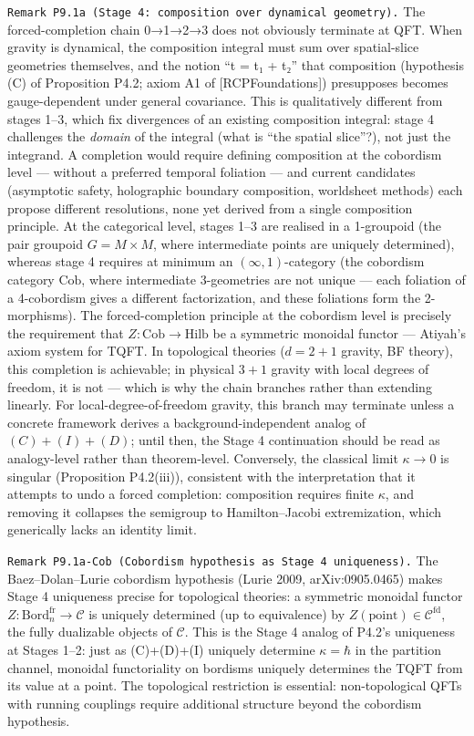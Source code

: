 \documentclass[
]{article}
\begin{document}
\texttt{Remark\ P9.1a\ (Stage\ 4:\ composition\ over\ dynamical\ geometry).}
The forced-completion chain 0→1→2→3 does not obviously terminate at QFT.
When gravity is dynamical, the composition integral must sum over
spatial-slice geometries themselves, and the notion ``t = t₁ + t₂'' that
composition (hypothesis (C) of Proposition P4.2; axiom A1 of
{[}RCPFoundations{]}) presupposes becomes gauge-dependent under general
covariance. This is qualitatively different from stages 1--3, which fix
divergences of an existing composition integral: stage 4 challenges the
\emph{domain} of the integral (what is ``the spatial slice''?), not just
the integrand. A completion would require defining composition at the
cobordism level --- without a preferred temporal foliation --- and
current candidates (asymptotic safety, holographic boundary composition,
worldsheet methods) each propose different resolutions, none yet derived
from a single composition principle. At the categorical level, stages
1--3 are realised in a 1-groupoid (the pair groupoid \(G = M \times M\),
where intermediate points are uniquely determined), whereas stage 4
requires at minimum an \((\infty,1)\)-category (the cobordism category
\(\mathrm{Cob}\), where intermediate 3-geometries are not unique ---
each foliation of a 4-cobordism gives a different factorization, and
these foliations form the 2-morphisms). The forced-completion principle
at the cobordism level is precisely the requirement that
\(Z\colon \mathrm{Cob} \to \mathrm{Hilb}\) be a symmetric monoidal
functor --- Atiyah's axiom system for TQFT. In topological theories
(\(d=2{+}1\) gravity, BF theory), this completion is achievable; in
physical \(3{+}1\) gravity with local degrees of freedom, it is not ---
which is why the chain branches rather than extending linearly. For
local-degree-of-freedom gravity, this branch may terminate unless a
concrete framework derives a background-independent analog of
\((C)+(I)+(D)\); until then, the Stage 4 continuation should be read as
analogy-level rather than theorem-level. Conversely, the classical limit
\(\kappa\to 0\) is singular (Proposition P4.2(iii)), consistent with the
interpretation that it attempts to undo a forced completion: composition
requires finite \(\kappa\), and removing it collapses the semigroup to
Hamilton--Jacobi extremization, which generically lacks an identity
limit.

\texttt{Remark\ P9.1a-Cob\ (Cobordism\ hypothesis\ as\ Stage\ 4\ uniqueness).}
The Baez--Dolan--Lurie cobordism hypothesis (Lurie 2009,
arXiv:0905.0465) makes Stage 4 uniqueness precise for topological
theories: a symmetric monoidal functor
\(Z\colon \mathrm{Bord}_n^{\mathrm{fr}} \to \mathcal{C}\) is uniquely
determined (up to equivalence) by
\(Z(\mathrm{point}) \in \mathcal{C}^{\mathrm{fd}}\), the fully
dualizable objects of \(\mathcal{C}\). This is the Stage 4 analog of
P4.2's uniqueness at Stages 1--2: just as (C)+(D)+(I) uniquely determine
\(\kappa = \hbar\) in the partition channel, monoidal functoriality on
bordisms uniquely determines the TQFT from its value at a point. The
topological restriction is essential: non-topological QFTs with running
couplings require additional structure beyond the cobordism hypothesis.
\end{document}
